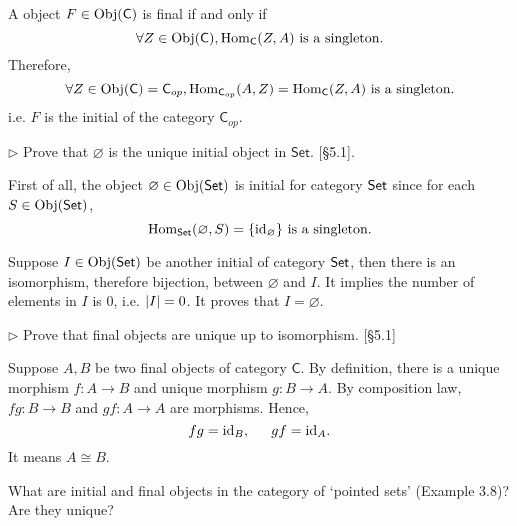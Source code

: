 \begin{solution}
A object $F\in\mathrm{Obj}(\mathsf{C})$ is final if and only if $$\forall Z\in \mathrm{Obj}(\mathsf{C}), \mathrm{Hom}_{\mathsf{C}}(Z,A) \text { is a singleton}.$$
Therefore, $$\forall Z\in \mathrm{Obj}(\mathsf{C})=\mathsf{C}_{op}, \mathrm{Hom}_{\mathsf{C}_{op}}(A, Z) = \mathrm{Hom}_{\mathsf{C}}(Z,A) \text { is a singleton}.$$
i.e. $F$ is the initial of the category $\mathsf{C}_{op}$.
\end{solution}

\begin{problem}[5.2]
  \def \Set {\mathsf{Set}}
  $\rhd$ Prove that $\varnothing$ is the unique initial object in $\Set$. [\S 5.1].
\end{problem}

\begin{solution}
First of all, the object $\varnothing\in \Obj(\Set)$ is initial for category $\Set$ since for each $S\in\Obj(\Set)$, 
$$\Hom_{\Set}(\varnothing, S)=\{\text{id}_{\varnothing}\} \text{ is a singleton}.$$

Suppose $I\in \Obj(\Set)$ be another initial of category $\Set$, then there is an isomorphism, therefore bijection, between $\varnothing$ and $I$. 
It implies the number of elements in $I$ is $0$, i.e. $\left|I\right| = 0$. It proves that $I=\varnothing$. 
\end{solution}

\begin{problem}[5.3]
  $\rhd$ Prove that final objects are unique up to isomorphism. [\S 5.1]
\end{problem}

\begin{solution}
Suppose $A,B$ be two final objects of category $\mathsf{C}$. By definition, there is a unique morphism $f: A \to B$ and unique morphism $g: B\to A$.
By composition law, $fg: B\to B$ and $gf: A\to A$ are morphisms. Hence,
$$fg=\text{id}_B, \indent gf=\text{id}_A.$$
It means $A\cong B$.
\end{solution}

\begin{problem}[5.4]
  What are initial and final objects in the category of `pointed sets' (Example
  3.8)? Are they unique?
\end{problem}

